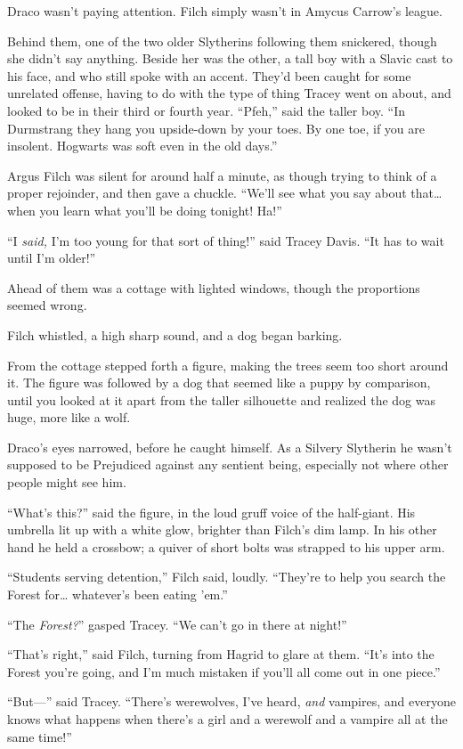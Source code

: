 Draco wasn’t paying attention. Filch simply wasn’t in Amycus Carrow’s league.

Behind them, one of the two older Slytherins following them snickered, though she didn’t say anything. Beside her was the other, a tall boy with a Slavic cast to his face, and who still spoke with an accent. They’d been caught for some unrelated offense, having to do with the type of thing Tracey went on about, and looked to be in their third or fourth year. “Pfeh,” said the taller boy. “In Durmstrang they hang you upside-down by your toes. By one toe, if you are insolent. Hogwarts was soft even in the old days.”

Argus Filch was silent for around half a minute, as though trying to think of a proper rejoinder, and then gave a chuckle. “We’ll see what you say about that…when you learn what you’ll be doing tonight! Ha!”

“I \emph{said,} I’m too young for that sort of thing!” said Tracey Davis. “It has to wait until I’m older!”

Ahead of them was a cottage with lighted windows, though the proportions seemed wrong.

Filch whistled, a high sharp sound, and a dog began barking.

From the cottage stepped forth a figure, making the trees seem too short around it. The figure was followed by a dog that seemed like a puppy by comparison, until you looked at it apart from the taller silhouette and realized the dog was huge, more like a wolf.

Draco’s eyes narrowed, before he caught himself. As a Silvery Slytherin he wasn’t supposed to be Prejudiced against any sentient being, especially not where other people might see him.

“What’s this?” said the figure, in the loud gruff voice of the half-giant. His umbrella lit up with a white glow, brighter than Filch’s dim lamp. In his other hand he held a crossbow; a quiver of short bolts was strapped to his upper arm.

“Students serving detention,” Filch said, loudly. “They’re to help you search the Forest for… whatever’s been eating ’em.”

“The \emph{Forest?}” gasped Tracey. “We can’t go in there at night!”

“That’s right,” said Filch, turning from Hagrid to glare at them. “It’s into the Forest you’re going, and I’m much mistaken if you’ll all come out in one piece.”

“But—” said Tracey. “There’s werewolves, I’ve heard, \emph{and} vampires, and everyone knows what happens when there’s a girl and a werewolf and a vampire all at the same time!”

